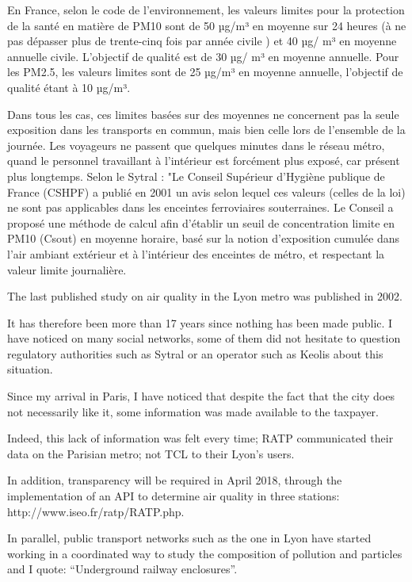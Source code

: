\documentclass[11pt]{article}
\begin{document}
En France, selon le code de l'environnement, les valeurs limites pour la
protection de la santé en matière de PM10 sont de 50 µg/m³ en moyenne
sur 24 heures (à ne pas dépasser plus de trente-cinq fois par année
civile ) et 40 µg/ m³ en moyenne annuelle civile. L'objectif de qualité
est de 30 µg/ m³ en moyenne annuelle. Pour les PM2.5, les valeurs
limites sont de 25 µg/m³ en moyenne annuelle, l'objectif de qualité
étant à 10 µg/m³.

Dans tous les cas, ces limites basées sur des moyennes ne concernent pas
la seule exposition dans les transports en commun, mais bien celle lors
de l'ensemble de la journée. Les voyageurs ne passent que quelques
minutes dans le réseau métro, quand le personnel travaillant à
l'intérieur est forcément plus exposé, car présent plus longtemps. Selon
le Sytral : "Le Conseil Supérieur d'Hygiène publique de France (CSHPF) a
publié en 2001 un avis selon lequel ces valeurs (celles de la loi) ne
sont pas applicables dans les enceintes ferroviaires souterraines. Le
Conseil a proposé une méthode de calcul afin d'établir un seuil de
concentration limite en PM10 (Csout) en moyenne horaire, basé sur la
notion d'exposition cumulée dans l'air ambiant extérieur et à
l'intérieur des enceintes de métro, et respectant la valeur limite
journalière.

    The last published study on air quality in the Lyon metro was published
in 2002.

It has therefore been more than 17 years since nothing has been made
public. I have noticed on many social networks, some of them did not
hesitate to question regulatory authorities such as Sytral or an
operator such as Keolis about this situation.

Since my arrival in Paris, I have noticed that despite the fact that the
city does not necessarily like it, some information was made available
to the taxpayer.

Indeed, this lack of information was felt every time; RATP communicated
their data on the Parisian metro; not TCL to their Lyon's users.

In addition, transparency will be required in April 2018, through the
implementation of an API to determine air quality in three stations:
http://www.iseo.fr/ratp/RATP.php.

In parallel, public transport networks such as the one in Lyon have
started working in a coordinated way to study the composition of
pollution and particles and I quote: ``Underground railway enclosures''.
\end{document}
